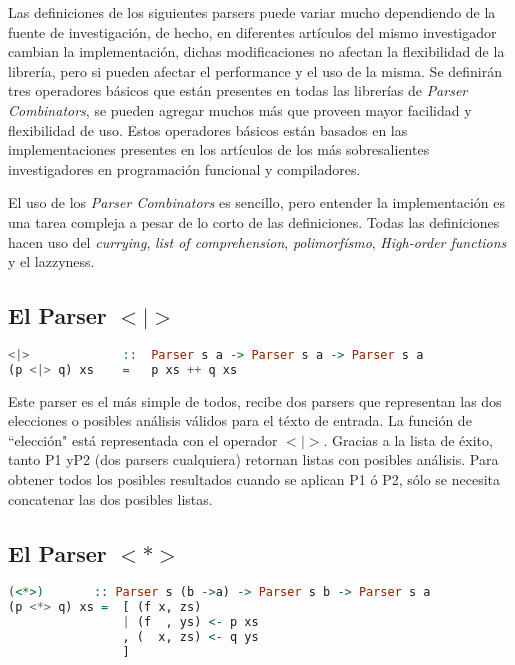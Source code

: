 Las definiciones de los siguientes parsers puede variar mucho dependiendo de la fuente de investigación, de hecho, en diferentes artículos del mismo investigador cambian la implementación, dichas modificaciones no afectan la flexibilidad de la librería, pero si pueden afectar el performance y el uso de la misma. Se definirán tres operadores básicos que están presentes en todas las librerías de \emph{Parser Combinators}, se pueden agregar muchos más que proveen mayor facilidad y flexibilidad de uso. Estos operadores básicos están basados en las implementaciones presentes en los artículos de los más sobresalientes investigadores en programación funcional y compiladores.

El uso de los \emph{Parser Combinators} es sencillo, pero entender la implementación es una tarea compleja a pesar de lo corto de las definiciones. Todas las definiciones hacen uso del \emph{currying}, \emph{list of comprehension}, \emph{polimorfísmo}, \emph{High-order functions} y el lazzyness.

\subsection{El Parser $<|>$}

\begin{lstlisting}[language=Haskell, caption=definición del parser de elección]
<|>				::	Parser s a -> Parser s a -> Parser s a
(p <|> q) xs	=	p xs ++ q xs
\end{lstlisting}

Este parser es el más simple de todos, recibe dos parsers que representan las dos elecciones o posibles análisis válidos para el téxto de entrada. La función de ``elección" está representada con el operador $<|>$. Gracias a la lista de éxito, tanto \textsc{P1} y\textsc{P2} (dos parsers cualquiera) retornan listas con posibles análisis. Para obtener todos los posibles resultados cuando se aplican \textsc{P1} ó \textsc{P2}, sólo se necesita concatenar las dos posibles listas.\cite{Jeuring2010}

\subsection{El Parser $<*>$}

\begin{lstlisting}[language=Haskell, caption=definición del parser de sequencia]
(<*>)		:: Parser s (b ->a) -> Parser s b -> Parser s a
(p <*> q) xs =	[ (f x, zs)
				| (f  , ys) <- p xs
				, (  x, zs) <- q ys
				]
\end{lstlisting}

